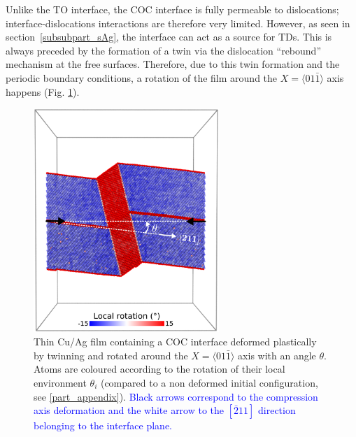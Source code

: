 \documentclass[final,3p,times,twocolumn]{elsarticle}
\begin{document}
Unlike the TO interface, the COC interface is fully permeable to dislocations; interface-dislocations interactions are therefore very limited. However, as seen in section~\ref{subsubpart_sAg}, the interface can act as a source for TDs. This is always preceded by the formation of a twin via the dislocation ``rebound'' mechanism at the free surfaces. Therefore, due to this twin formation and the periodic boundary conditions, a rotation of the film around the $X=\langle01\bar{1}\rangle$ axis happens (Fig. \ref{fig_rotation}).
\begin{figure}[!h]
	\begin{center}
		\includegraphics[width=70mm]{Pic/fig_rotation.eps} 
	\end{center}
	\caption{Thin Cu/Ag film containing a COC interface deformed plastically by twinning and rotated around the $X=\langle01\bar{1}\rangle$ axis with an angle $\theta$. Atoms are coloured according to the rotation of their local environment $\theta_{i}$ (compared to a non deformed initial configuration, see \ref{part_appendix}). \textcolor{blue}{Black arrows correspond to the compression axis deformation and the white arrow to the $[\bar{2}11]$ direction belonging to the interface plane.}}\label{fig_rotation}
\end{figure}
\end{document}
